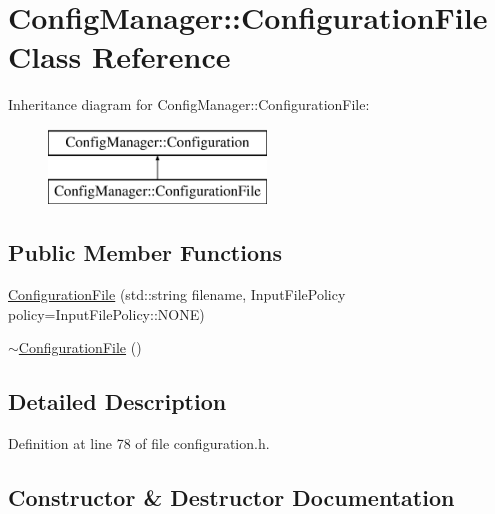 \hypertarget{class_config_manager_1_1_configuration_file}{}\section{Config\+Manager\+:\+:Configuration\+File Class Reference}
\label{class_config_manager_1_1_configuration_file}
Inheritance diagram for Config\+Manager\+:\+:Configuration\+File\+:\begin{figure}[H]
\begin{center}
\leavevmode
\includegraphics[height=2.000000cm]{class_config_manager_1_1_configuration_file}
\end{center}
\end{figure}
\subsection*{Public Member Functions}
\begin{DoxyCompactItemize}
\item 
\hyperlink{class_config_manager_1_1_configuration_file_a07d5355e097215f22a31f8e3e1d73aae}{Configuration\+File} (std\+::string filename, Input\+File\+Policy policy=Input\+File\+Policy\+::\+N\+O\+NE)
\item 
\hyperlink{class_config_manager_1_1_configuration_file_ab58c1860cb0d3b502f674975000736a5}{$\sim$\+Configuration\+File} ()
\end{DoxyCompactItemize}


\subsection{Detailed Description}


Definition at line 78 of file configuration.\+h.



\subsection{Constructor \& Destructor Documentation}
